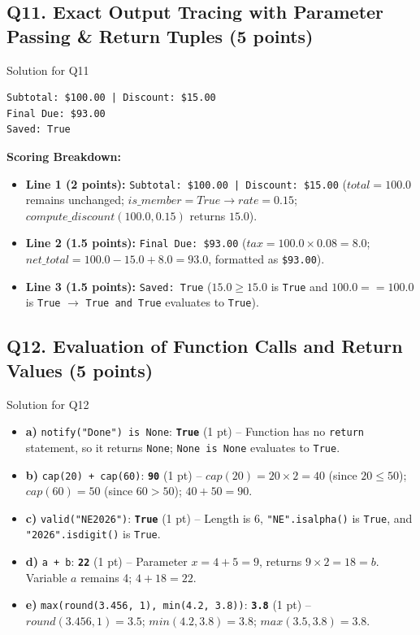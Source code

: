 \documentclass[11pt,a4paper]{article}
\begin{document}
\subsection*{Q11. Exact Output Tracing with Parameter Passing \& Return Tuples (5 points)}
\begin{solbox}{Solution for Q11}
\begin{lstlisting}
Subtotal: $100.00 | Discount: $15.00
Final Due: $93.00
Saved: True
\end{lstlisting}
\textbf{Scoring Breakdown:}
\begin{itemize}[leftmargin=2em, itemsep=1pt]
  \item \textbf{Line 1 (2 points):} \texttt{Subtotal: \$100.00 | Discount: \$15.00} ($total = 100.0$ remains unchanged; $is\_member = True \rightarrow rate = 0.15$; $compute\_discount(100.0, 0.15)$ returns $15.0$).
  \item \textbf{Line 2 (1.5 points):} \texttt{Final Due: \$93.00} ($tax = 100.0 \times 0.08 = 8.0$; $net\_total = 100.0 - 15.0 + 8.0 = 93.0$, formatted as \texttt{\$93.00}).
  \item \textbf{Line 3 (1.5 points):} \texttt{Saved: True} ($15.0 \ge 15.0$ is \texttt{True} and $100.0 == 100.0$ is \texttt{True} $\rightarrow$ \texttt{True and True} evaluates to \texttt{True}).
\end{itemize}
\end{solbox}

\vspace{0.3cm}

\subsection*{Q12. Evaluation of Function Calls and Return Values (5 points)}
\begin{solbox}{Solution for Q12}
\begin{itemize}[leftmargin=2em, itemsep=3pt]
  \item \textbf{a)} \texttt{notify("Done") is None}: \textbf{\texttt{True}} (1 pt) -- Function has no \texttt{return} statement, so it returns \texttt{None}; \texttt{None is None} evaluates to \texttt{True}.
  \item \textbf{b)} \texttt{cap(20) + cap(60)}: \textbf{\texttt{90}} (1 pt) -- $cap(20) = 20 \times 2 = 40$ (since $20 \le 50$); $cap(60) = 50$ (since $60 > 50$); $40 + 50 = 90$.
  \item \textbf{c)} \texttt{valid("NE2026")}: \textbf{\texttt{True}} (1 pt) -- Length is 6, \texttt{"NE".isalpha()} is \texttt{True}, and \texttt{"2026".isdigit()} is \texttt{True}.
  \item \textbf{d)} \texttt{a + b}: \textbf{\texttt{22}} (1 pt) -- Parameter $x = 4 + 5 = 9$, returns $9 \times 2 = 18 = b$. Variable $a$ remains 4; $4 + 18 = 22$.
  \item \textbf{e)} \texttt{max(round(3.456, 1), min(4.2, 3.8))}: \textbf{\texttt{3.8}} (1 pt) -- $round(3.456, 1) = 3.5$; $min(4.2, 3.8) = 3.8$; $max(3.5, 3.8) = 3.8$.
\end{itemize}
\end{solbox}
\end{document}
